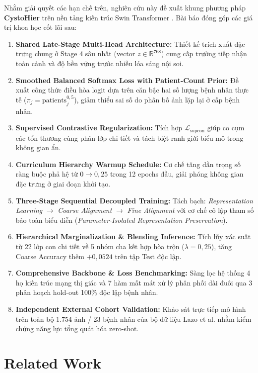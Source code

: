 \documentclass[runningheads]{llncs}
\begin{document}
Nhằm giải quyết các hạn chế trên, nghiên cứu này đề xuất khung phương pháp \textbf{CystoHier} trên nền tảng kiến trúc Swin Transformer \cite{ref_liu2021swin}. Bài báo đóng góp các giá trị khoa học cốt lõi sau:
\begin{enumerate}
    \item \textbf{Shared Late-Stage Multi-Head Architecture:} Thiết kế trích xuất đặc trưng chung ở Stage 4 sâu nhất (vector $z \in \mathbb{R}^{768}$) cung cấp trường tiếp nhận toàn cảnh và độ bền vững trước nhiễu lóa sáng nội soi.
    \item \textbf{Smoothed Balanced Softmax Loss with Patient-Count Prior:} Đề xuất công thức điều hòa logit dựa trên căn bậc hai số lượng bệnh nhân thực tế ($\pi_j = \text{patients}_j^{0{,}5}$), giảm thiểu sai số do phân bố ảnh lặp lại ở cấp bệnh nhân.
    \item \textbf{Supervised Contrastive Regularization:} Tích hợp $\mathcal{L}_{\text{supcon}}$ giúp co cụm các tổn thương cùng phân lớp chi tiết và tách biệt ranh giới biểu mô trong không gian ẩn.
    \item \textbf{Curriculum Hierarchy Warmup Schedule:} Cơ chế tăng dần trọng số ràng buộc phả hệ từ $0 \to 0{,}25$ trong 12 epochs đầu, giải phóng không gian đặc trưng ở giai đoạn khởi tạo.
    \item \textbf{Three-Stage Sequential Decoupled Training:} Tách bạch: \textit{Representation Learning} $\to$ \textit{Coarse Alignment} $\to$ \textit{Fine Alignment} với cơ chế cô lập tham số bảo toàn biểu diễn (\textit{Parameter-Isolated Representation Preservation}).
    \item \textbf{Hierarchical Marginalization \& Blending Inference:} Tích lũy xác suất từ 22 lớp con chi tiết về 5 nhóm cha kết hợp hòa trộn ($\lambda=0{,}25$), tăng Coarse Accuracy thêm $+0{,}0524$ trên tập Test độc lập.
    \item \textbf{Comprehensive Backbone \& Loss Benchmarking:} Sàng lọc hệ thống 4 họ kiến trúc mạng thị giác và 7 hàm mất mát xử lý phân phối dài đuôi qua 3 phân hoạch hold-out 100\% độc lập bệnh nhân.
    \item \textbf{Independent External Cohort Validation:} Khảo sát trực tiếp mô hình trên toàn bộ 1.754 ảnh / 23 bệnh nhân của bộ dữ liệu Lazo et al. \cite{ref_lazo2023semisupervised} nhằm kiểm chứng năng lực tổng quát hóa zero-shot.
\end{enumerate}

\section{Related Work}
\label{sec:related_work}
\end{document}
